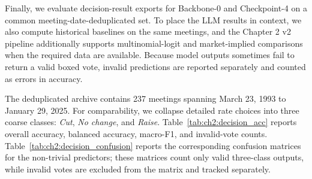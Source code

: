 %
%
Finally, we evaluate decision-result exports for Backbone-0 and Checkpoint-4 on a common meeting-date-deduplicated set. To place the LLM results in context, we also compute historical baselines on the same meetings, and the Chapter 2 v2 pipeline additionally supports multinomial-logit and market-implied comparisons when the required data are available. Because model outputs sometimes fail to return a valid boxed vote, invalid predictions are reported separately and counted as errors in accuracy.

The deduplicated archive contains 237 meetings spanning March 23, 1993 to January 29, 2025. For comparability, we collapse detailed rate choices into three coarse classes: \textit{Cut}, \textit{No change}, and \textit{Raise}. Table~\ref{tab:ch2:decision_acc} reports overall accuracy, balanced accuracy, macro-F1, and invalid-vote counts. Table~\ref{tab:ch2:decision_confusion} reports the corresponding confusion matrices for the non-trivial predictors; these matrices count only valid three-class outputs, while invalid votes are excluded from the matrix and tracked separately.

